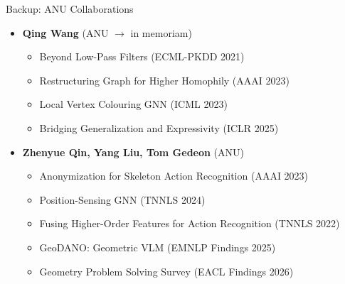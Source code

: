 \documentclass[aspectratio=169,11pt]{beamer}
\begin{document}
\begin{frame}{Backup: ANU Collaborations}
  \small
  \begin{itemize}\setlength\itemsep{2pt}
    \item \textbf{Qing Wang} (ANU $\to$ in memoriam)
    \begin{itemize}\setlength\itemsep{1pt}
      \item Beyond Low-Pass Filters (ECML-PKDD 2021)
      \item Restructuring Graph for Higher Homophily (AAAI 2023)
      \item Local Vertex Colouring GNN (ICML 2023)
      \item Bridging Generalization and Expressivity (ICLR 2025)
    \end{itemize}
    \item \textbf{Zhenyue Qin, Yang Liu, Tom Gedeon} (ANU)
    \begin{itemize}\setlength\itemsep{1pt}
      \item Anonymization for Skeleton Action Recognition (AAAI 2023)
      \item Position-Sensing GNN (TNNLS 2024)
      \item Fusing Higher-Order Features for Action Recognition (TNNLS 2022)
      \item GeoDANO: Geometric VLM (EMNLP Findings 2025)
      \item Geometry Problem Solving Survey (EACL Findings 2026)
    \end{itemize}
  \end{itemize}
\end{frame}
\end{document}
